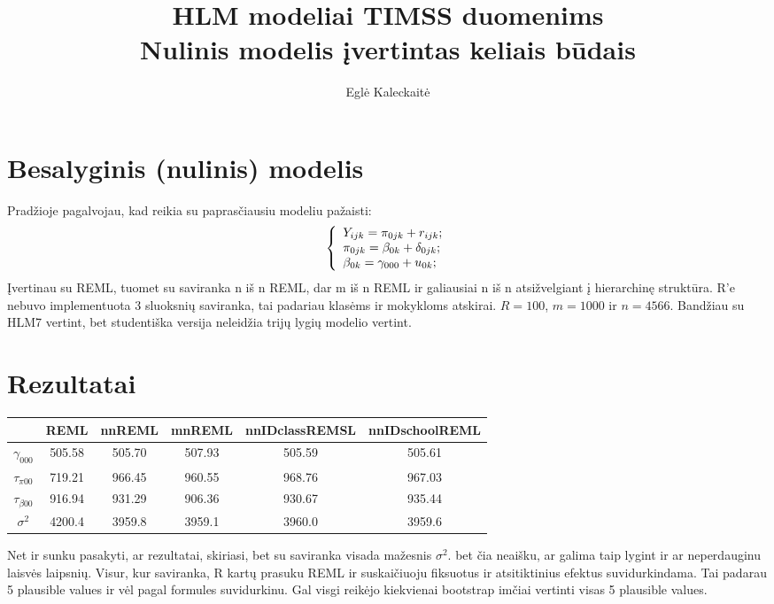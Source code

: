 \documentclass[a4paper]{article}
\title{HLM modeliai TIMSS duomenims\\Nulinis modelis įvertintas keliais būdais}
\author{Eglė Kaleckaitė}
\begin{document}


\maketitle
\section{Besalyginis (nulinis) modelis}

Pradžioje pagalvojau, kad reikia su paprasčiausiu modeliu pažaisti:
\[ \left\{
  \begin{array}{l l}
    Y_{ijk} = \pi_{0jk}+r_{ijk}; \\
    \pi_{0jk} = \beta_{0k} + \delta_{0jk};\\
    \beta_{0k} = \gamma_{000} + u_{0k};
  \end{array} \right.\]
Įvertinau su REML, tuomet su saviranka n iš n REML, dar m iš n REML ir galiausiai n iš n atsižvelgiant į hierarchinę struktūra. R'e nebuvo implementuota 3 sluoksnių saviranka, tai padariau klasėms ir mokykloms atskirai. $R = 100$, $m = 1000$ ir $n = 4566$. Bandžiau su HLM7 vertint, bet studentiška versija neleidžia trijų lygių modelio vertint.
\section{Rezultatai}

\begin{table}[ht]
\centering
\begin{tabular}{cccccc}
  \hline
 & REML & nnREML & mnREML & nnIDclassREMSL & nnIDschoolREML \\ 
  \hline
$\gamma_{000}$ & 505.58 & 505.70 & 507.93 & 505.59 & 505.61 \\ 
  $\tau_{\pi 00}$ & 719.21 & 966.45 & 960.55 & 968.76 & 967.03 \\ 
  $\tau_{\beta 00}$ & 916.94 & 931.29 & 906.36 & 930.67 & 935.44 \\ 
  $\sigma^2$ & 4200.4 & 3959.8 & 3959.1 & 3960.0 & 3959.6 \\ 
   \hline
\end{tabular}
\end{table}

Net ir sunku pasakyti, ar rezultatai, skiriasi, bet su saviranka visada mažesnis $\sigma^2$. bet čia neaišku, ar galima taip lygint ir ar neperdauginu laisvės laipsnių. Visur, kur saviranka, R kartų prasuku REML ir suskaičiuoju fiksuotus ir atsitiktinius efektus suvidurkindama. Tai padarau 5 plausible values ir vėl pagal formules suvidurkinu. Gal visgi reikėjo kiekvienai bootstrap imčiai vertinti visas 5 plausible values.
\end{document}
